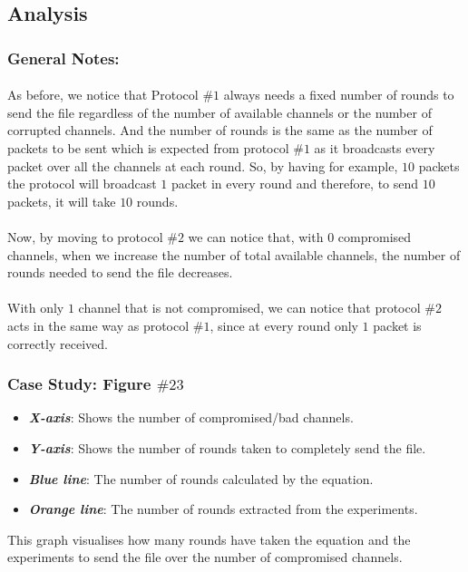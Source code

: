 \documentclass[main.tex]{subfiles}
\begin{document}
\subsection{Analysis}
\subsubsection{General Notes:}
\paragraph{}As before, we notice that Protocol $\#1$ always needs a fixed number of rounds to send the file regardless of the number of available channels or the number of corrupted channels. And the number of rounds is the same as the number of packets to be sent which is expected from protocol $\#1$ as it broadcasts every packet over all the channels at each round. So, by having for example, $10$ packets the protocol will broadcast $1$ packet in every round and therefore, to send $10$ packets, it will take $10$ rounds.
\paragraph{}Now, by moving to protocol $\#2$ we can notice that, with $0$ compromised channels, when we increase the number of total available channels, the number of rounds needed to send the file decreases.
\paragraph{}With only $1$ channel that is not compromised, we can notice that protocol $\#2$ acts in the same way as protocol  $\#1$, since at every round only $1$ packet is correctly received.  
\subsubsection{Case Study: Figure $\#23$}
\begin{itemize}
\item \textbf{\textit{X-axis}}: Shows the number of compromised/bad channels.
\item \textbf{\textit{Y-axis}}: Shows the number of rounds taken to completely send the file.
\item \textbf{\textit{Blue line}}: The number of rounds calculated by the equation.
\item \textbf{\textit{Orange line}}: The number of rounds extracted from the experiments.
\end{itemize}
This graph visualises how many rounds have taken the equation and the experiments to send the file over the number of compromised channels.
\end{document}
